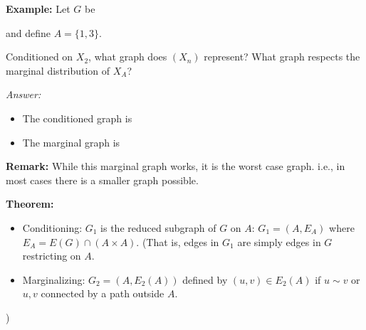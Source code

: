 \documentclass[12pt]{report}
\newcommand*{\tbf}[1]{\ifmmode\mathbf{#1}\else\textbf{#1}\fi}
\newenvironment*{proposition}[1][gray]{
\begin{tcolorbox}[
    parbox=false,
    colback=#1!5!white,
    colframe=#1!75!black,
    breakable
]}
{\end{tcolorbox}}
\begin{document}
\tbf{Example:} Let $G$ be
\begin{center}
    and define $A = \{1, 3\}$.

    Conditioned on $X_2$, what graph does $(X_n)$ represent? What graph respects the marginal distribution of $X_A$?

    \emph{Answer:}

    \begin{itemize}
        \item The conditioned graph is

              \begin{center}
              \end{center}

        \item The marginal graph is
              \begin{center}
              \end{center}
    \end{itemize}
\end{center}

\tbf{Remark:} While this marginal graph works, it is the worst case graph. i.e., in most cases there is a smaller graph possible.

\begin{proposition}
    \textbf{Theorem:}
    \begin{itemize}
        \item Conditioning: $G_1$ is the reduced subgraph of $G$ on $A$:
              $G_1 = (A, E_A)$ where $E_A = E(G) \cap (A \times A)$. (That is, edges in $G_1$ are simply edges in $G$ restricting on $A$.
        \item Marginalizing: $G_2 = (A, E_2(A))$ defined by $(u, v) \in E_2(A)$ if $u \sim v$ or $u, v$ connected by a path outside $A$.
    \end{itemize})
\end{proposition}
\end{document}
